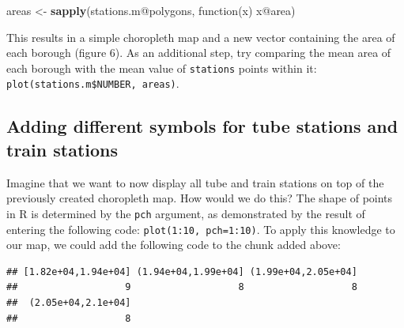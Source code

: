 \documentclass[]{article}
\newenvironment{Shaded}{}{}
\newcommand{\KeywordTok}[1]{\textcolor[rgb]{0.00,0.44,0.13}{\textbf{{#1}}}}
\newcommand{\DataTypeTok}[1]{\textcolor[rgb]{0.56,0.13,0.00}{{#1}}}
\newcommand{\StringTok}[1]{\textcolor[rgb]{0.25,0.44,0.63}{{#1}}}
\newcommand{\NormalTok}[1]{{#1}}
\begin{document}
\begin{Shaded}
\begin{Highlighting}[]
\NormalTok{areas <-}\StringTok{ }\KeywordTok{sapply}\NormalTok{(stations.m@polygons, function(x) x@area)}
\end{Highlighting}
\end{Shaded}

This results in a simple choropleth map and a new vector containing the
area of each borough (figure 6). As an additional step, try comparing
the mean area of each borough with the mean value of \texttt{stations}
points within it: \texttt{plot(stations.m\$NUMBER, areas)}.

\subsection{Adding different symbols for tube stations and train
stations}\label{adding-different-symbols-for-tube-stations-and-train-stations}

Imagine that we want to now display all tube and train stations on top
of the previously created choropleth map. How would we do this? The
shape of points in R is determined by the \texttt{pch} argument, as
demonstrated by the result of entering the following code:
\texttt{plot(1:10, pch=1:10)}. To apply this knowledge to our map, we
could add the following code to the chunk added above:

\begin{Shaded}
\end{Shaded}

\begin{verbatim}
## [1.82e+04,1.94e+04] (1.94e+04,1.99e+04] (1.99e+04,2.05e+04] 
##                   9                   8                   8 
##  (2.05e+04,2.1e+04] 
##                   8
\end{verbatim}
\end{document}
